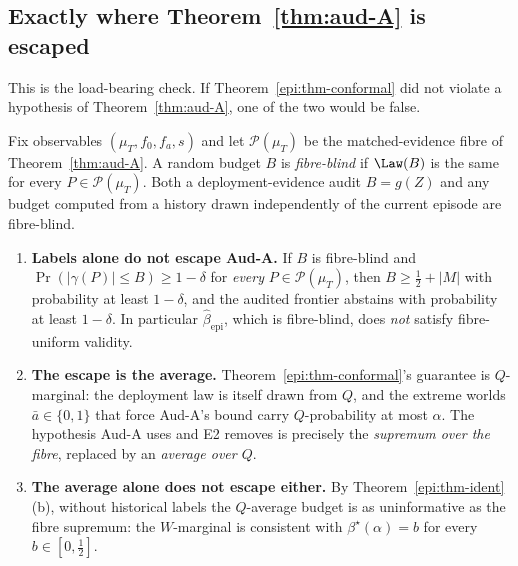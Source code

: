 \subsection{Exactly where Theorem~\ref{thm:aud-A} is escaped}

This is the load-bearing check. If Theorem~\ref{epi:thm-conformal} did not violate a hypothesis of
Theorem~\ref{thm:aud-A}, one of the two would be false.

\begin{definition}\label{epi:def-fibreblind}
Fix observables $(\mu_T,f_0,f_a,s)$ and let $\mathcal P(\mu_T)$ be the matched-evidence fibre of
Theorem~\ref{thm:aud-A}. A random budget $B$ is \emph{fibre-blind} if $\Law(B)$ is the same for every
$P\in\mathcal P(\mu_T)$. Both a deployment-evidence audit $B=g(Z)$ and any budget computed from a
history drawn independently of the current episode are fibre-blind.
\end{definition}

\begin{proposition}\label{epi:prop-escape}
\begin{enumerate}
\item[\textnormal{(a)}] \textbf{Labels alone do not escape Aud-A.} If $B$ is fibre-blind and
$\Pr(|\gamma(P)|\le B)\ge1-\delta$ for \emph{every} $P\in\mathcal P(\mu_T)$, then
$B\ge\tfrac12+|M|$ with probability at least $1-\delta$, and the audited frontier abstains with
probability at least $1-\delta$. In particular $\widehat\beta_{\mathrm{epi}}$, which is fibre-blind,
does \emph{not} satisfy fibre-uniform validity.
\item[\textnormal{(b)}] \textbf{The escape is the average.} Theorem~\ref{epi:thm-conformal}'s
guarantee is $Q$-marginal: the deployment law is itself drawn from $Q$, and the extreme worlds
$\bar a\in\{0,1\}$ that force Aud-A's bound carry $Q$-probability at most $\alpha$. The
hypothesis Aud-A uses and E2 removes is precisely the \emph{supremum over the fibre}, replaced by an
\emph{average over $Q$}.
\item[\textnormal{(c)}] \textbf{The average alone does not escape either.} By
Theorem~\ref{epi:thm-ident}(b), without historical labels the $Q$-average budget is as
uninformative as the fibre supremum: the $W$-marginal is consistent with $\beta^\star(\alpha)=b$ for
every $b\in[0,\tfrac12]$.
\end{enumerate}
\end{proposition}

